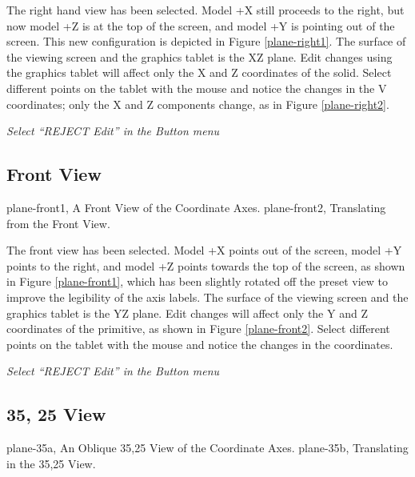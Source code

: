
The right hand view has been selected. Model +X still proceeds to the right,
but now model +Z is at the top of the screen, and model +Y is
pointing out of the screen.
This new configuration is depicted in Figure \ref{plane-right1}.
The surface of the viewing screen and the graphics tablet is the XZ plane.
Edit changes using the graphics tablet will affect only the X and Z
coordinates of the solid.
Select different points on the tablet with the mouse and notice the
changes in the V coordinates;  only the X and Z components change,
as in Figure \ref{plane-right2}.

{\em Select ``REJECT Edit'' in the Button menu}

\subsection{Front View}
\mfig plane-front1, A Front View of the Coordinate Axes.
\mfig plane-front2, Translating from the Front View.


The front view has been selected.  Model +X points out of the screen,
model +Y points to the right, and model +Z points towards the top
of the screen, as shown in Figure \ref{plane-front1},
which has been slightly rotated off the preset view to improve
the legibility of the axis labels.
The surface of the viewing screen and the graphics tablet is the YZ
plane.  Edit changes will affect only the Y and Z
coordinates of the primitive, as shown in Figure \ref{plane-front2}.
Select different points on the tablet with the mouse and notice the
changes in the coordinates.

{\em Select ``REJECT Edit'' in the Button menu}

\subsection{35, 25 View}
\mfig plane-35a, An Oblique 35,25 View of the Coordinate Axes.
\mfig plane-35b, Translating in the 35,25 View.

